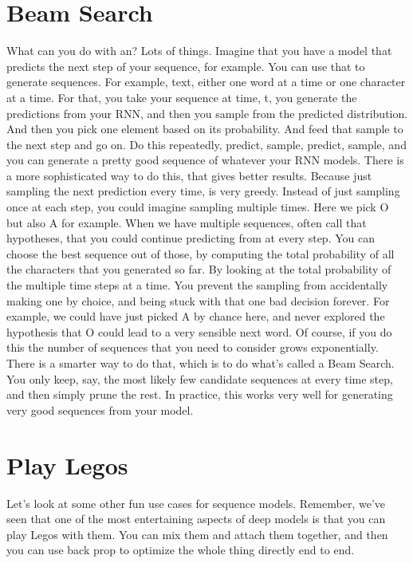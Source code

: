 \documentclass{article}
\begin{document}
\section{Beam Search}
What can you do with an?
Lots of things.
Imagine that you have a model
that predicts the next step
of your sequence, for example.
You can use that to generate sequences.
For example, text, either one word at
a time or one character at a time.
For that, you take your sequence at
time, t, you generate the predictions
from your RNN, and then you sample
from the predicted distribution.
And then you pick one element
based on its probability.
And feed that sample to
the next step and go on.
Do this repeatedly, predict,
sample, predict, sample, and
you can generate a pretty good
sequence of whatever your RNN models.
There is a more sophisticated way to
do this, that gives better results.
Because just sampling the next
prediction every time, is very greedy.
Instead of just sampling
once at each step,
you could imagine
sampling multiple times.
Here we pick O but also A for example.
When we have multiple sequences,
often call that hypotheses,
that you could continue
predicting from at every step.
You can choose the best sequence out
of those, by computing the total
probability of all the characters
that you generated so far.
By looking at the total probability
of the multiple time steps at a time.
You prevent the sampling from
accidentally making one by choice, and
being stuck with that one
bad decision forever.
For example, we could have just
picked A by chance here, and
never explored the hypothesis that O
could lead to a very sensible next word.
Of course, if you do this the number
of sequences that you need to consider
grows exponentially.
There is a smarter way to do that, which
is to do what's called a Beam Search.
You only keep, say, the most likely few
candidate sequences at every time step,
and then simply prune the rest.
In practice, this works very well for
generating very good
sequences from your model.
\section{Play Legos}
Let's look at some other fun
use cases for sequence models.
Remember, we've seen that one of the
most entertaining aspects of deep models
is that you can play Legos with them.
You can mix them and
attach them together, and
then you can use back prop to optimize
the whole thing directly end to end.
\end{document}
